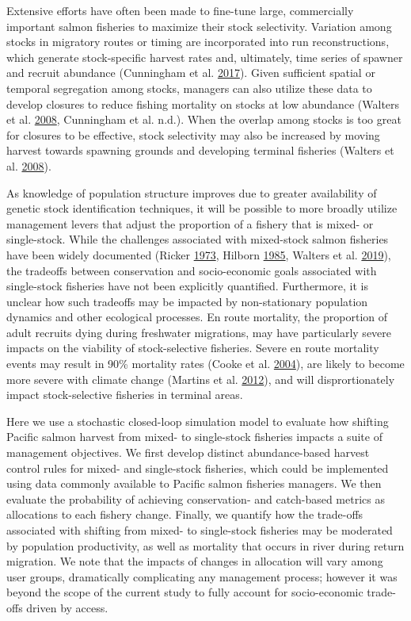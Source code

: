 \documentclass[11pt]{book}
\begin{document}
Extensive efforts have often been made to fine-tune large, commercially important salmon fisheries to maximize their stock selectivity. Variation among stocks in migratory routes or timing are incorporated into run reconstructions, which generate stock-specific harvest rates and, ultimately, time series of spawner and recruit abundance (Cunningham et al. \protect\hyperlink{ref-Cunningham2017}{2017}). Given sufficient spatial or temporal segregation among stocks, managers can also utilize these data to develop closures to reduce fishing mortality on stocks at low abundance (Walters et al. \protect\hyperlink{ref-Walters2008}{2008}, Cunningham et al. n.d.). When the overlap among stocks is too great for closures to be effective, stock selectivity may also be increased by moving harvest towards spawning grounds and developing terminal fisheries (Walters et al. \protect\hyperlink{ref-Walters2008}{2008}).

As knowledge of population structure improves due to greater availability of genetic stock identification techniques, it will be possible to more broadly utilize management levers that adjust the proportion of a fishery that is mixed- or single-stock. While the challenges associated with mixed-stock salmon fisheries have been widely documented (Ricker \protect\hyperlink{ref-Ricker1973}{1973}, Hilborn \protect\hyperlink{ref-Hilborn1985}{1985}, Walters et al. \protect\hyperlink{ref-Walters2019}{2019}), the tradeoffs between conservation and socio-economic goals associated with single-stock fisheries have not been explicitly quantified. Furthermore, it is unclear how such tradeoffs may be impacted by non-stationary population dynamics and other ecological processes. En route mortality, the proportion of adult recruits dying during freshwater migrations, may have particularly severe impacts on the viability of stock-selective fisheries. Severe en route mortality events may result in 90\% mortality rates (Cooke et al. \protect\hyperlink{ref-Cooke2004}{2004}), are likely to become more severe with climate change (Martins et al. \protect\hyperlink{ref-Martins2012}{2012}), and will disprortionately impact stock-selective fisheries in terminal areas.

Here we use a stochastic closed-loop simulation model to evaluate how shifting Pacific salmon harvest from mixed- to single-stock fisheries impacts a suite of management objectives. We first develop distinct abundance-based harvest control rules for mixed- and single-stock fisheries, which could be implemented using data commonly available to Pacific salmon fisheries managers. We then evaluate the probability of achieving conservation- and catch-based metrics as allocations to each fishery change. Finally, we quantify how the trade-offs associated with shifting from mixed- to single-stock fisheries may be moderated by population productivity, as well as mortality that occurs in river during return migration. We note that the impacts of changes in allocation will vary among user groups, dramatically complicating any management process; however it was beyond the scope of the current study to fully account for socio-economic trade-offs driven by access.
\end{document}
